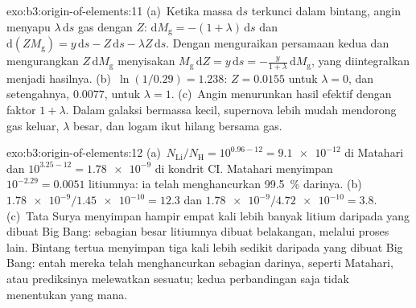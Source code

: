 \begin{solution}{exo:b3:origin-of-elements:11}
(a)~Ketika massa $\mathrm{d}s$ terkunci dalam bintang, angin menyapu
$\lambda\,\mathrm{d}s$ gas dengan  $Z$:
$\mathrm{d}M_\mathrm{g} = -(1 + \lambda)\,\mathrm{d}s$ dan
$\mathrm{d}(ZM_\mathrm{g}) = y\,\mathrm{d}s - Z\,\mathrm{d}s -
\lambda Z\,\mathrm{d}s$. Dengan menguraikan persamaan kedua dan mengurangkan
$Z\,\mathrm{d}M_\mathrm{g}$ menyisakan $M_\mathrm{g}\,\mathrm{d}Z =
y\,\mathrm{d}s = -\frac{y}{1 + \lambda}\,\mathrm{d}M_\mathrm{g}$, yang
diintegralkan menjadi hasilnya. (b)~$\ln(1/0.29) = 1.238$: $Z = 0.0155$ untuk
$\lambda = 0$, dan setengahnya, $0.0077$, untuk $\lambda = 1$. (c)~Angin
menurunkan hasil efektif dengan faktor $1 + \lambda$. Dalam galaksi
bermassa kecil, supernova lebih mudah mendorong gas keluar, $\lambda$ besar,
dan logam ikut hilang bersama gas.
\end{solution}

\begin{solution}{exo:b3:origin-of-elements:12}
(a)~$N_\mathrm{Li}/N_\mathrm{H} = 10^{0.96 - 12} = \num{9.1e-12}$ di
Matahari dan $10^{3.25 - 12} = \num{1.78e-9}$ di kondrit CI. Matahari
menyimpan $10^{-2.29} = \num{0.0051}$ litiumnya: ia telah menghancurkan
\qty{99.5}{\percent} darinya. (b)~$\num{1.78e-9}/\num{1.45e-10} = 12.3$ dan
$\num{1.78e-9}/\num{4.72e-10} = 3.8$. (c)~Tata Surya menyimpan hampir
empat kali lebih banyak litium daripada yang dibuat Big Bang: sebagian besar litiumnya dibuat
belakangan, melalui proses lain. Bintang tertua menyimpan tiga kali
lebih sedikit daripada yang dibuat Big Bang: entah mereka telah menghancurkan sebagian darinya, seperti
Matahari, atau prediksinya melewatkan sesuatu; kedua perbandingan
saja tidak menentukan yang mana.
\end{solution}

